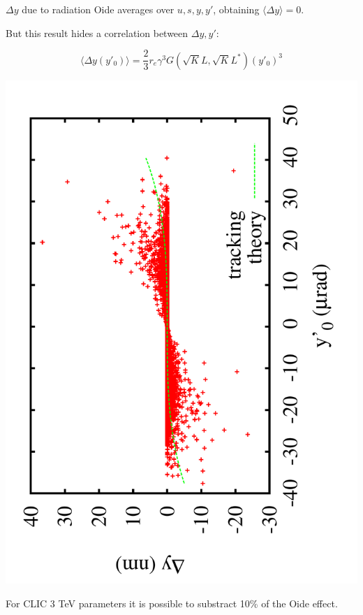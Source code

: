 \documentclass{beamer}
\begin{document}
\begin{frame}{$\Delta y$ due to radiation}
Oide averages over $u,s,y,y'$, obtaining $\langle \Delta y \rangle = 0$.\par
But this result hides a correlation between $\Delta y, y'$:\par
\begin{equation*}
 \langle\Delta y (y'_0)\rangle = \frac{2}{3}r_e\gamma^3G(\sqrt{K}L,\sqrt{K}L^*)(y'_0)^3
\end{equation*}
\par\centering\vspace*{-0.5cm}
\includegraphics[scale=0.25,angle=-90]{plotdyrad.pdf}\par\centering
{\scriptsize For CLIC 3 TeV parameters it is possible to substract 10\% of the Oide effect.}\par
\end{frame}
\end{document}
